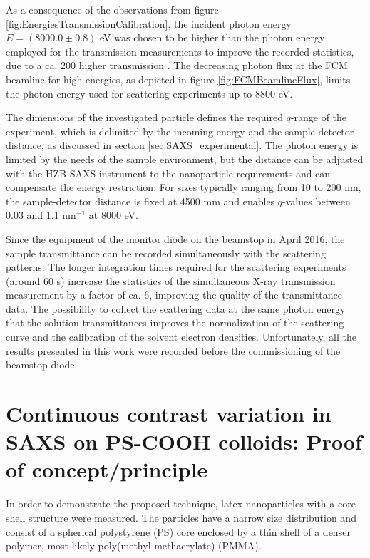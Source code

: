 As a consequence of the observations from figure \ref{fig:EnergiesTransmissionCalibration}, the incident photon energy \(E = \left(8000.0  \pm 0.8\right)\) eV was chosen to be higher than the photon energy employed for the transmission measurements to improve the recorded statistics, due to a ca. 200 higher transmission \cite{henke_x-ray_1993}. The decreasing photon flux at the FCM beamline for high energies, as depicted in figure \ref{fig:FCMBeamlineFlux}, limits the photon energy used for scattering experiments up to 8800 eV.

The dimensions of the investigated particle defines the required $q$-range of the experiment, which is delimited by the incoming energy and the sample-detector distance, as discussed in section \ref{sec:SAXS_experimental}. The photon energy is limited by the needs of the sample environment, but the distance can be adjusted with the HZB-SAXS instrument to the nanoparticle requirements and can compensate the energy restriction. For sizes typically ranging from 10 to 200 nm, the sample-detector distance is fixed at 4500 mm and enables $q$-values between 0.03 and 1.1 nm$^{-1}$ at 8000 eV.

Since the equipment of the monitor diode on the beamstop in April 2016, the sample transmittance can be recorded simultaneously with the scattering patterns. The longer integration times required for the scattering experiments (around 60 s) increase the statistics of the simultaneous X-ray transmission measurement by a factor of ca. 6, improving the quality of the transmittance data. The possibility to collect the scattering data at the same photon energy that the solution transmittances improves the normalization of the scattering curve and the calibration of the solvent electron densities. Unfortunately, all the results presented in this work were recorded before the commissioning of the beamstop diode.

\section{Continuous contrast variation in SAXS on PS-COOH colloids: Proof of concept/principle}
\label{sec:KiskerResults}

In order to demonstrate the proposed technique, latex nanoparticles with a core-shell structure were measured. The particles have a narrow size distribution and consist of a spherical polystyrene (PS) core enclosed by a thin shell of a denser polymer, most likely poly(methyl methacrylate) (PMMA).

